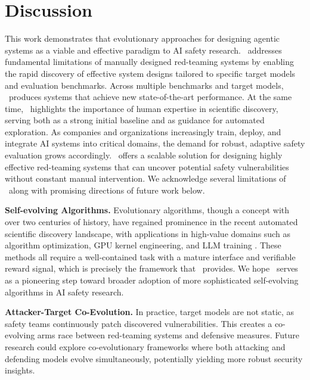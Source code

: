 \section{Discussion}
This work demonstrates that evolutionary approaches for designing agentic systems as a viable and effective paradigm to AI safety research. \method~addresses fundamental limitations of manually designed red-teaming systems by enabling the rapid discovery of effective system designs tailored to specific target models and evaluation benchmarks. Across multiple benchmarks and target models, \method~produces systems that achieve new state-of-the-art performance. At the same time, \method~highlights the importance of human expertise in scientific discovery, serving both as a strong initial baseline and as guidance for automated exploration. As companies and organizations increasingly train, deploy, and integrate AI systems into critical domains, the demand for robust, adaptive safety evaluation grows accordingly. \method~offers a scalable solution for designing highly effective red-teaming systems that can uncover potential safety vulnerabilities without constant manual intervention. We acknowledge several limitations of \method~along with promising directions of future work below.

\label{appx: limitation & future works}
\textbf{Self-evolving Algorithms.} Evolutionary algorithms, though a concept with over two centuries of history, have regained prominence in the recent automated scientific discovery landscape, with applications in high-value domains such as algorithm optimization, GPU kernel engineering, and LLM training \citep{novikov2025alphaevolvecodingagentscientific,yuksekgonul2026learningdiscovertesttime,karpathy2026autoresearch}. These methods all require a well-contained task with a mature interface and verifiable reward signal, which is precisely the framework that \method~provides. We hope \method~serves as a pioneering step toward broader adoption of more sophisticated self-evolving algorithms in AI safety research.

\textbf{Attacker-Target Co-Evolution.} In practice, target models are not static, as safety teams continuously patch discovered vulnerabilities. This creates a co-evolving arms race between red-teaming systems and defensive measures. Future research could explore co-evolutionary frameworks where both attacking and defending models evolve simultaneously, potentially yielding more robust security insights.

